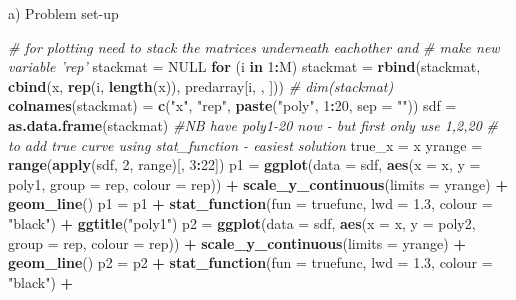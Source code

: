 \documentclass[ignorenonframetext,]{beamer}
\newenvironment{Shaded}{\begin{snugshade}}{\end{snugshade}}
\newcommand{\KeywordTok}[1]{\textcolor[rgb]{0.13,0.29,0.53}{\textbf{#1}}}
\newcommand{\DataTypeTok}[1]{\textcolor[rgb]{0.13,0.29,0.53}{#1}}
\newcommand{\DecValTok}[1]{\textcolor[rgb]{0.00,0.00,0.81}{#1}}
\newcommand{\FloatTok}[1]{\textcolor[rgb]{0.00,0.00,0.81}{#1}}
\newcommand{\StringTok}[1]{\textcolor[rgb]{0.31,0.60,0.02}{#1}}
\newcommand{\CommentTok}[1]{\textcolor[rgb]{0.56,0.35,0.01}{\textit{#1}}}
\newcommand{\OtherTok}[1]{\textcolor[rgb]{0.56,0.35,0.01}{#1}}
\newcommand{\ControlFlowTok}[1]{\textcolor[rgb]{0.13,0.29,0.53}{\textbf{#1}}}
\newcommand{\OperatorTok}[1]{\textcolor[rgb]{0.81,0.36,0.00}{\textbf{#1}}}
\newcommand{\NormalTok}[1]{#1}
\begin{document}
\begin{frame}[fragile]
\begin{block}{a) Problem set-up}
\begin{Shaded}
\begin{Highlighting}[]
\CommentTok{# for plotting need to stack the matrices underneath eachother and}
\CommentTok{# make new variable 'rep'}
\NormalTok{stackmat =}\StringTok{ }\OtherTok{NULL}
\ControlFlowTok{for}\NormalTok{ (i }\ControlFlowTok{in} \DecValTok{1}\OperatorTok{:}\NormalTok{M) stackmat =}\StringTok{ }\KeywordTok{rbind}\NormalTok{(stackmat, }\KeywordTok{cbind}\NormalTok{(x, }\KeywordTok{rep}\NormalTok{(i, }\KeywordTok{length}\NormalTok{(x)), }
\NormalTok{    predarray[i, , ]))}
\CommentTok{# dim(stackmat)}
\KeywordTok{colnames}\NormalTok{(stackmat) =}\StringTok{ }\KeywordTok{c}\NormalTok{(}\StringTok{"x"}\NormalTok{, }\StringTok{"rep"}\NormalTok{, }\KeywordTok{paste}\NormalTok{(}\StringTok{"poly"}\NormalTok{, }\DecValTok{1}\OperatorTok{:}\DecValTok{20}\NormalTok{, }\DataTypeTok{sep =} \StringTok{""}\NormalTok{))}
\NormalTok{sdf =}\StringTok{ }\KeywordTok{as.data.frame}\NormalTok{(stackmat)  }\CommentTok{#NB have poly1-20 now - but first only use 1,2,20}
\CommentTok{# to add true curve using stat_function - easiest solution}
\NormalTok{true_x =}\StringTok{ }\NormalTok{x}
\NormalTok{yrange =}\StringTok{ }\KeywordTok{range}\NormalTok{(}\KeywordTok{apply}\NormalTok{(sdf, }\DecValTok{2}\NormalTok{, range)[, }\DecValTok{3}\OperatorTok{:}\DecValTok{22}\NormalTok{])}
\NormalTok{p1 =}\StringTok{ }\KeywordTok{ggplot}\NormalTok{(}\DataTypeTok{data =}\NormalTok{ sdf, }\KeywordTok{aes}\NormalTok{(}\DataTypeTok{x =}\NormalTok{ x, }\DataTypeTok{y =}\NormalTok{ poly1, }\DataTypeTok{group =}\NormalTok{ rep, }\DataTypeTok{colour =}\NormalTok{ rep)) }\OperatorTok{+}\StringTok{ }
\StringTok{    }\KeywordTok{scale_y_continuous}\NormalTok{(}\DataTypeTok{limits =}\NormalTok{ yrange) }\OperatorTok{+}\StringTok{ }\KeywordTok{geom_line}\NormalTok{()}
\NormalTok{p1 =}\StringTok{ }\NormalTok{p1 }\OperatorTok{+}\StringTok{ }\KeywordTok{stat_function}\NormalTok{(}\DataTypeTok{fun =}\NormalTok{ truefunc, }\DataTypeTok{lwd =} \FloatTok{1.3}\NormalTok{, }\DataTypeTok{colour =} \StringTok{"black"}\NormalTok{) }\OperatorTok{+}\StringTok{ }
\StringTok{    }\KeywordTok{ggtitle}\NormalTok{(}\StringTok{"poly1"}\NormalTok{)}
\NormalTok{p2 =}\StringTok{ }\KeywordTok{ggplot}\NormalTok{(}\DataTypeTok{data =}\NormalTok{ sdf, }\KeywordTok{aes}\NormalTok{(}\DataTypeTok{x =}\NormalTok{ x, }\DataTypeTok{y =}\NormalTok{ poly2, }\DataTypeTok{group =}\NormalTok{ rep, }\DataTypeTok{colour =}\NormalTok{ rep)) }\OperatorTok{+}\StringTok{ }
\StringTok{    }\KeywordTok{scale_y_continuous}\NormalTok{(}\DataTypeTok{limits =}\NormalTok{ yrange) }\OperatorTok{+}\StringTok{ }\KeywordTok{geom_line}\NormalTok{()}
\NormalTok{p2 =}\StringTok{ }\NormalTok{p2 }\OperatorTok{+}\StringTok{ }\KeywordTok{stat_function}\NormalTok{(}\DataTypeTok{fun =}\NormalTok{ truefunc, }\DataTypeTok{lwd =} \FloatTok{1.3}\NormalTok{, }\DataTypeTok{colour =} \StringTok{"black"}\NormalTok{) }\OperatorTok{+}\StringTok{ }

\end{Highlighting}
\end{Shaded}
\end{block}
\end{frame}
\end{document}
